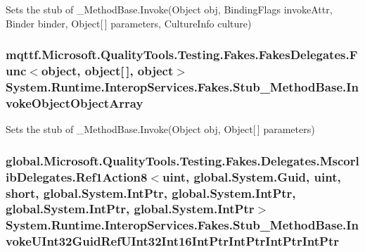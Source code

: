 Sets the stub of \-\_\-\-Method\-Base.\-Invoke(\-Object obj, Binding\-Flags invoke\-Attr, Binder binder, Object\mbox{[}$\,$\mbox{]} parameters, Culture\-Info culture)

\hypertarget{class_system_1_1_runtime_1_1_interop_services_1_1_fakes_1_1_stub___method_base_a7f0bb2ebcbdd3005f493e1aa5c5802ec}{
\subsubsection[{Invoke\-Object\-Object\-Array}]{\setlength{\rightskip}{0pt plus 5cm}mqttf.\-Microsoft.\-Quality\-Tools.\-Testing.\-Fakes.\-Fakes\-Delegates.\-Func$<$object, object\mbox{[}$\,$\mbox{]}, object$>$ System.\-Runtime.\-Interop\-Services.\-Fakes.\-Stub\-\_\-\-Method\-Base.\-Invoke\-Object\-Object\-Array}}\label{class_system_1_1_runtime_1_1_interop_services_1_1_fakes_1_1_stub___method_base_a7f0bb2ebcbdd3005f493e1aa5c5802ec}


Sets the stub of \-\_\-\-Method\-Base.\-Invoke(\-Object obj, Object\mbox{[}$\,$\mbox{]} parameters)

\hypertarget{class_system_1_1_runtime_1_1_interop_services_1_1_fakes_1_1_stub___method_base_adf12933fea79945115c3018ffdd8ba8c}{
\subsubsection[{Invoke\-U\-Int32\-Guid\-Ref\-U\-Int32\-Int16\-Int\-Ptr\-Int\-Ptr\-Int\-Ptr\-Int\-Ptr}]{\setlength{\rightskip}{0pt plus 5cm}global.\-Microsoft.\-Quality\-Tools.\-Testing.\-Fakes.\-Delegates.\-Mscorlib\-Delegates.\-Ref1\-Action8$<$uint, global.\-System.\-Guid, uint, short, global.\-System.\-Int\-Ptr, global.\-System.\-Int\-Ptr, global.\-System.\-Int\-Ptr, global.\-System.\-Int\-Ptr$>$ System.\-Runtime.\-Interop\-Services.\-Fakes.\-Stub\-\_\-\-Method\-Base.\-Invoke\-U\-Int32\-Guid\-Ref\-U\-Int32\-Int16\-Int\-Ptr\-Int\-Ptr\-Int\-Ptr\-Int\-Ptr}}\label{class_system_1_1_runtime_1_1_interop_services_1_1_fakes_1_1_stub___method_base_adf12933fea79945115c3018ffdd8ba8c}


